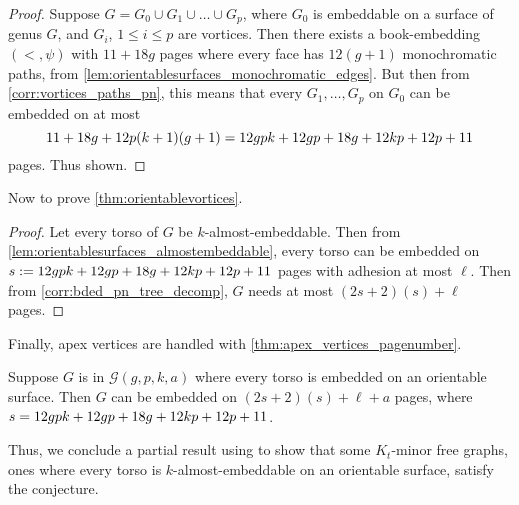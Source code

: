\begin{proof}
	Suppose $G = G_0 \cup G_1 \cup \ldots \cup G_p$, where $G_0$ is embeddable on a surface of genus $G$, and $G_i$, $1 \leq i \leq p$ are vortices. Then there exists a book-embedding $(<, \psi)$ with $11 + 18g$ pages where every face has $12(g+1)$ monochromatic paths, from \cref{lem:orientablesurfaces_monochromatic_edges}. But then from \cref{corr:vortices_paths_pn}, this means that every $G_1, \ldots, G_p$ on $G_0$ can be embedded on at most \[11 + 18g + 12p(k + 1)(g + 1) = 12gpk + 12gp + 18g + 12kp + 12p + 11 \] pages. Thus shown.
\end{proof}

Now to prove \cref{thm:orientablevortices}. 
\begin{proof}
	Let every torso of $G$ be $k$-almost-embeddable. Then from \cref{lem:orientablesurfaces_almostembeddable}, every torso can be embedded on $s := 12gpk + 12gp + 18g + 12kp + 12p + 11 $ pages with adhesion at most $\ell$. Then from \cref{corr:bded_pn_tree_decomp}, $G$ needs at most $(2s + 2)(s) + \ell$ pages.
\end{proof}

Finally, apex vertices are handled with \cref{thm:apex_vertices_pagenumber}. 
\begin{corollary}\label{corr:orientable_surfaces_gpka}
	Suppose $G$ is in $\mathcal{G}(g, p, k, a)$ where every torso is embedded on an orientable surface. Then $G$ can be embedded on $(2s + 2)(s) + \ell + a$ pages, where $s = 12gpk + 12gp + 18g + 12kp + 12p + 11$. 
\end{corollary}
Thus, we conclude a partial result using \textcite{robertsonGraphMinorsXVI2003} to show that some $K_t$-minor free graphs, ones where every torso is $k$-almost-embeddable on an orientable surface, satisfy the conjecture.